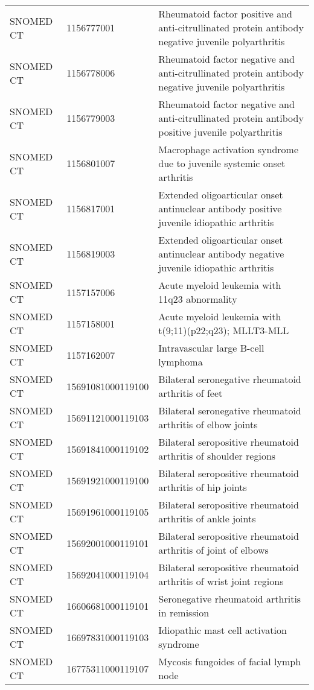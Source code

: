\begin{longtable}{p{}p{}p{}}
  SNOMED CT & 1156777001 & Rheumatoid factor positive and anti-citrullinated protein antibody negative juvenile polyarthritis \\ 
  SNOMED CT & 1156778006 & Rheumatoid factor negative and anti-citrullinated protein antibody negative juvenile polyarthritis \\ 
  SNOMED CT & 1156779003 & Rheumatoid factor negative and anti-citrullinated protein antibody positive juvenile polyarthritis \\ 
  SNOMED CT & 1156801007 & Macrophage activation syndrome due to juvenile systemic onset arthritis \\ 
  SNOMED CT & 1156817001 & Extended oligoarticular onset antinuclear antibody positive juvenile idiopathic arthritis \\ 
  SNOMED CT & 1156819003 & Extended oligoarticular onset antinuclear antibody negative juvenile idiopathic arthritis \\ 
  SNOMED CT & 1157157006 & Acute myeloid leukemia with 11q23 abnormality \\ 
  SNOMED CT & 1157158001 & Acute myeloid leukemia with t(9;11)(p22;q23); MLLT3-MLL \\ 
  SNOMED CT & 1157162007 & Intravascular large B-cell lymphoma \\ 
  SNOMED CT & 15691081000119100 & Bilateral seronegative rheumatoid arthritis of feet \\ 
  SNOMED CT & 15691121000119103 & Bilateral seronegative rheumatoid arthritis of elbow joints \\ 
  SNOMED CT & 15691841000119102 & Bilateral seropositive rheumatoid arthritis of shoulder regions \\ 
  SNOMED CT & 15691921000119100 & Bilateral seropositive rheumatoid arthritis of hip joints \\ 
  SNOMED CT & 15691961000119105 & Bilateral seropositive rheumatoid arthritis of ankle joints \\ 
  SNOMED CT & 15692001000119101 & Bilateral seropositive rheumatoid arthritis of joint of elbows \\ 
  SNOMED CT & 15692041000119104 & Bilateral seropositive rheumatoid arthritis of wrist joint regions \\ 
  SNOMED CT & 16606681000119101 & Seronegative rheumatoid arthritis in remission \\ 
  SNOMED CT & 16697831000119103 & Idiopathic mast cell activation syndrome \\ 
  SNOMED CT & 16775311000119107 & Mycosis fungoides of facial lymph node \\ 

\end{longtable}
